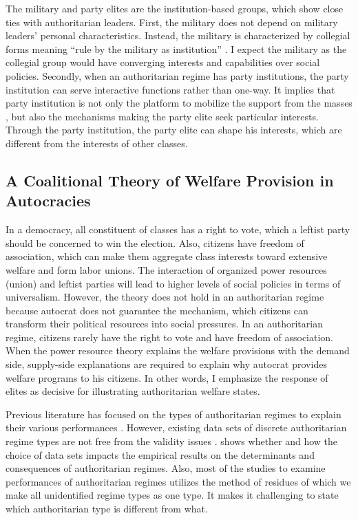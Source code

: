 \documentclass[11pt]{article}
\begin{document}
The military and party elites are the institution-based groups, which show close ties with authoritarian leaders. First, the military does not depend on military leaders’ personal characteristics. Instead, the military is characterized by collegial forms meaning ``rule by the military as institution'' \citep{Geddes2014b, Kim2017}. I expect the military as the collegial group would have converging interests and capabilities over social policies. Secondly, when an authoritarian regime has party institutions, the party institution can serve interactive functions rather than one-way. It implies that party institution is not only the platform to mobilize the support from the masses \citep{Gandhi2006}, but also the mechanisms making the party elite seek particular interests. Through the party institution, the party elite can shape his interests, which are different from the interests of other classes.



\subsection{A Coalitional Theory of Welfare Provision in Autocracies}

In a democracy, all constituent of classes has a right to vote, which a leftist party should be concerned to win the election. Also, citizens have freedom of association, which can make them aggregate class interests toward extensive welfare and form labor unions. The interaction of organized power resources (union) and leftist parties will lead to higher levels of social policies in terms of universalism. However, the theory does not hold in an authoritarian regime because autocrat does not guarantee the mechanism, which citizens can transform their political resources into social pressures. In an authoritarian regime, citizens rarely have the right to vote and have freedom of association. When the power resource theory explains the welfare provisions with the demand side, supply-side explanations are required to explain why autocrat provides welfare programs to his citizens. In other words, I emphasize the response of elites as decisive for illustrating authoritarian welfare states.

Previous literature has focused on the types of authoritarian regimes to explain their various performances \citep{Charron2011a,Roller2013,Cassani2017a,Yan2019}. However, existing data sets of discrete authoritarian regime types are not free from the validity issues \citep{Wilson2014}. \citet[52]{Roller2013} shows whether and how the choice of data sets impacts the empirical results on the determinants and consequences of authoritarian regimes. Also, most of the studies to examine performances of authoritarian regimes utilizes the method of residues of which we make all unidentified regime types as one type. It makes it challenging to state which authoritarian type is different from what.
\end{document}
